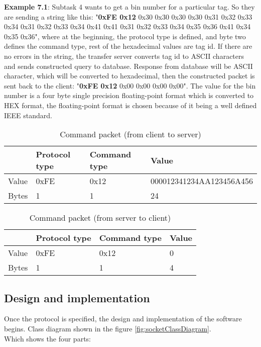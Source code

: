 \textbf{Example 7.1}: Subtask 4 wants to get a bin number for a particular tag. So they are sending a string like this: 
"\textbf{0xFE 0x12} 0x30 0x30 0x30 0x30 0x31 0x32 0x33 0x34 0x31 0x32 0x33 0x34 0x41 0x41 0x31 0x32 0x33 0x34 0x35 0x36 0x41 0x34 0x35 0x36", where at the beginning, the protocol type is defined, and byte two defines the command type, rest of the hexadecimal values are tag id. If there are no errors in the string, the transfer server converts tag id to ASCII characters and sends constructed query to database. Response from database will be ASCII character, which will be converted to hexadecimal, then the constructed packet is sent back to the client: "\textbf{0xFE 0x12} 0x00 0x00 0x00 0x00". The value for the bin number is a four byte single precision floating-point format which is converted to HEX format, the floating-point format is chosen because of it being a well defined IEEE standard.

\begin{table}[h]
	\centering
    \begin{tabular}{ | p{1cm} | p{3cm} | p{3cm} | p{5cm} |}
    \hline
	& \textbf{Protocol type} & \textbf{Command type} & \textbf{Value}  \\ \hline
	Value & 0xFE & 0x12 & 000012341234AA123456A456 \\ \hline
	Bytes & 1 & 1 & 24  \\ \hline
    \end{tabular}
	\caption{Command packet (from client to server)}
	\label{tab:FromClient}
\end{table}

\begin{table}[h]
	\centering
    \begin{tabular}{ | p{1cm} | p{3cm} | p{3cm} | p{5cm} |}
    \hline
	& \textbf{Protocol type} & \textbf{Command type} & \textbf{Value}  \\ \hline
	Value & 0xFE & 0x12 & 0 \\ \hline
	Bytes & 1 & 1 & 4  \\ \hline
    \end{tabular}
	\caption{Command packet (from server to client)}
	\label{tab:FromServer}
\end{table}

\subsection{Design and implementation}

Once the protocol is specified, the design and implementation of the software begins. Class diagram shown in the figure \ref{fig:socketClassDiagram}. \\ Which shows the four parts:

